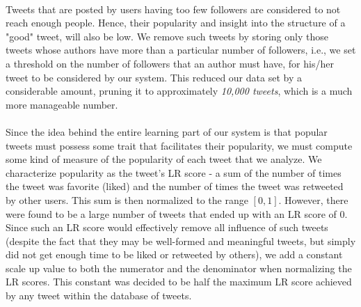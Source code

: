 \paragraph{}
Tweets that are posted by users having too few followers are considered to not reach enough people. Hence, their popularity and insight into the structure of a "good" tweet, will also be low. We remove such tweets by storing only those tweets whose authors have more than a particular number of followers, i.e., we set a threshold on the number of followers that an author must have, for his/her tweet to be considered by our system. This reduced our data set by a considerable amount, pruning it to approximately \textit{10,000 tweets}, which is a much more manageable number.
\paragraph{}
Since the idea behind the entire learning part of our system is that popular tweets must possess some trait that facilitates their popularity, we must compute some kind of measure of the popularity of each tweet that we analyze. We characterize popularity as the tweet's LR score - a sum of the number of times the tweet was favorite (liked) and the number of times the tweet was retweeted by other users. This sum is then normalized to the range $[0, 1]$. However, there were found to be a large number of tweets that ended up with an LR score of 0. Since such an LR score would effectively remove all influence of such tweets (despite the fact that they may be well-formed and meaningful tweets, but simply did not get enough time to be liked or retweeted by others), we add a constant scale up value to both the numerator and the denominator when normalizing the LR scores. This constant was decided to be half the maximum LR score achieved by any tweet within the database of tweets.
